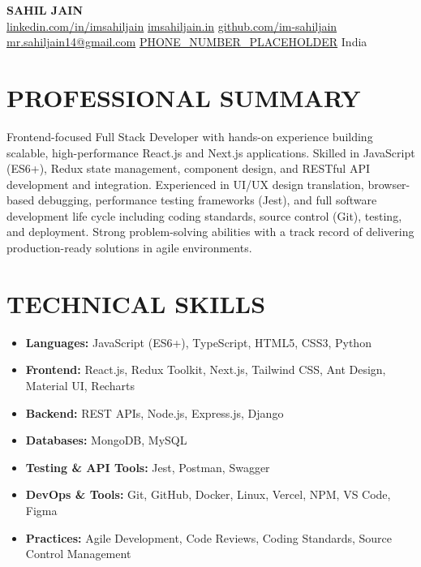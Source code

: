 \documentclass[10pt, letterpaper]{article}
\newcommand{\skillrow}[2]{%
  \item \textbf{#1:} #2
}
\begin{document}

\begin{center}
  {\LARGE\bfseries\color{primaryblue} SAHIL JAIN}\\[4pt]
  \href{https://www.linkedin.com/in/imsahiljain/}{linkedin.com/in/imsahiljain} \textbar{}
  \href{https://imsahiljain.in}{imsahiljain.in} \textbar{}
  \href{https://github.com/im-sahiljain}{github.com/im-sahiljain} \textbar{} 
  \href{mailto:mr.sahiljain14@gmail.com}{mr.sahiljain14@gmail.com} \textbar{} 
  \href{tel:PHONE_NUMBER_PLACEHOLDER}{PHONE_NUMBER_PLACEHOLDER} \textbar{} 
  \small\color{primaryblue} India
\end{center}

\vspace{2pt}

\section*{PROFESSIONAL SUMMARY}

Frontend-focused Full Stack Developer with hands-on experience building scalable, high-performance React.js and Next.js applications. Skilled in JavaScript (ES6+), Redux state management, component design, and RESTful API development and integration. Experienced in UI/UX design translation, browser-based debugging, performance testing frameworks (Jest), and full software development life cycle including coding standards, source control (Git), testing, and deployment. Strong problem-solving abilities with a track record of delivering production-ready solutions in agile environments.

\section*{TECHNICAL SKILLS}

\begin{itemize}[leftmargin=1.4em, itemsep=2pt]
  \skillrow{Languages}{JavaScript (ES6+), TypeScript, HTML5, CSS3, Python}
  \skillrow{Frontend}{React.js, Redux Toolkit, Next.js, Tailwind CSS, Ant Design, Material UI, Recharts}
  \skillrow{Backend}{REST APIs, Node.js, Express.js, Django }
  \skillrow{Databases}{MongoDB, MySQL}
  \skillrow{Testing \& API Tools}{Jest, Postman, Swagger}
  \skillrow{DevOps \& Tools}{Git, GitHub, Docker, Linux, Vercel, NPM, VS Code, Figma}
  \skillrow{Practices}{Agile Development, Code Reviews, Coding Standards, Source Control Management}
\end{itemize}
\end{document}
